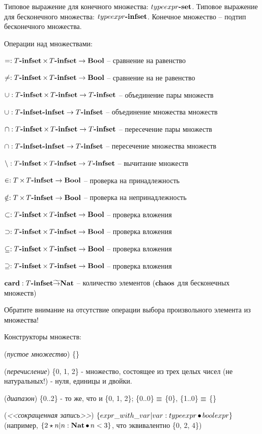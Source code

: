 \documentclass[14pt, twoside]{extreport}
\begin{document}
Типовое выражение для конечного множества: $typeexpr\textbf{-set}$. Типовое выражение для бесконечного множества: $typeexpr\textbf{-infset}$. Конечное множество -- подтип бесконечного множества.

Операции над множествами:
\begin{list}{}{}
\item $= : T\textbf{-infset} \mathop{\times} T\textbf{-infset} \rightarrow \textbf{Bool}$ -- сравнение на равенство
\item $\neq : T\textbf{-infset} \mathop{\times} T\textbf{-infset} \rightarrow \textbf{Bool}$ -- сравнение на не равенство
\item $\mathop{\cup}: T\textbf{-infset} \mathop{\times} T\textbf{-infset} \rightarrow T\textbf{-infset}$ -- объединение пары множеств
\item $\mathop{\cup}: T\textbf{-infset}\textbf{-infset} \rightarrow T\textbf{-infset}$ -- объединение множества множеств
\item $\mathop{\cap}: T\textbf{-infset} \mathop{\times} T\textbf{-infset} \rightarrow T\textbf{-infset}$ -- пересечение пары множеств
\item $\mathop{\cap}: T\textbf{-infset}\textbf{-infset} \rightarrow T\textbf{-infset}$ -- пересечение множества множеств
\item $\mathop{\setminus}: T\textbf{-infset} \mathop{\times} T\textbf{-infset} \rightarrow T\textbf{-infset}$ -- вычитание множеств
\item $\in: T \mathop{\times} T\textbf{-infset} \rightarrow \textbf{Bool}$ -- проверка на принадлежность
\item $\notin: T \mathop{\times} T\textbf{-infset} \rightarrow \textbf{Bool}$ -- проверка на непринадлежность
\item $\subset: T\textbf{-infset} \mathop{\times} T\textbf{-infset} \rightarrow \textbf{Bool}$ -- проверка вложения
\item $\supset: T\textbf{-infset} \mathop{\times} T\textbf{-infset} \rightarrow \textbf{Bool}$ -- проверка вложения
\item $\subseteq: T\textbf{-infset} \mathop{\times} T\textbf{-infset} \rightarrow \textbf{Bool}$ -- проверка вложения
\item $\supseteq: T\textbf{-infset} \mathop{\times} T\textbf{-infset} \rightarrow \textbf{Bool}$ -- проверка вложения
\item $\mathop{\textbf{card}}: T\textbf{-infset} \widetilde{\rightarrow} \textbf{Nat}$ -- количество элементов
($\textbf{chaos}$ для бесконечных множеств)
\end{list}

Обратите внимание на отсутствие операции выбора произвольного элемента из множества!

Конструкторы множеств:
\begin{list}{}{}
\item (\emph{пустое множество}) \{\}
\item (\emph{перечисление}) \{0, 1, 2\} - множество, состоящее из трех целых чисел (не
натуральных!) - нуля, единицы и двойки.
\item (\emph{диапазон}) \{0..2\} -  то же, что и \{0, 1, 2\};
\{0..0\} $\mathop{\equiv}$ \{0\}, \{1..0\} $\mathop{\equiv}$ \{\}
\item (\emph{<<сокращенная запись>>}) $\{ expr\_with\_var | var : typeexpr
\mathop{\bullet} boolexpr\}$ (например, $\{2 \star n | n : \textbf{Nat} \mathop{\bullet} n < 3
\}$, что эквивалентно \{0, 2, 4\})
\end{list}
\end{document}
